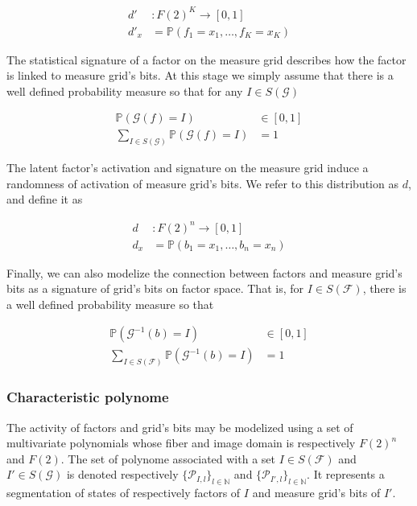 \documentclass[a4paper, 11pt]{article}
\begin{document}
\begin{align*}
d' &: F(2)^{K} \rightarrow [0,1]\\
d'_x &= \mathbb{P}\left(f_1 = x_1, \ldots, f_K = x_K \right)
\end{align*}

The statistical signature of a factor on the measure grid describes how the factor is linked to measure grid's bits. At this stage we simply assume that there is a well defined probability measure so that for any $I \in S(\mathcal{G})$

\begin{align*}
\mathbb{P}(\mathcal{G}(f) = I) &\in [0, 1]\\
\sum_{I \in S(\mathcal{G})} \mathbb{P}(\mathcal{G}(f) = I) &=1
\end{align*}

The latent factor's activation and signature on the measure grid induce a randomness of activation of measure grid's bits. We  refer to this distribution as $d$, and define it as

\begin{align*}
d &: F(2)^{n} \rightarrow [0,1]\\
d_x &= \mathbb{P}\left(b_1 = x_1, \ldots, b_n = x_n \right)
\end{align*}

Finally, we can also modelize the connection between factors and measure grid's bits as a signature of grid's bits on factor space. That is, for $I \in S(\mathcal{F})$, there is a well defined probability measure so that 

\begin{align*}
\mathbb{P}(\mathcal{G}^{-1}(b) = I) &\in [0, 1]\\
\sum_{I \in S(\mathcal{F})} \mathbb{P}(\mathcal{G}^{-1}(b) = I) &=1
\end{align*}


\subsubsection*{Characteristic polynome}

The activity of factors and grid's bits may be modelized using a set of multivariate polynomials whose fiber and image domain is respectively $F(2)^{n}$ and $F(2)$. The set of polynome associated with a set $I \in S(\mathcal{F})$ and $I' \in S(\mathcal{G})$ is denoted respectively $\lbrace \mathcal{P}_{I, l} \rbrace_{l \in \mathbb{N}}$  and $\lbrace \mathcal{P}_{I', l} \rbrace_{l \in \mathbb{N}}$. It represents a segmentation of states of respectively factors of $I$ and measure grid's bits of $I'$.
\end{document}
